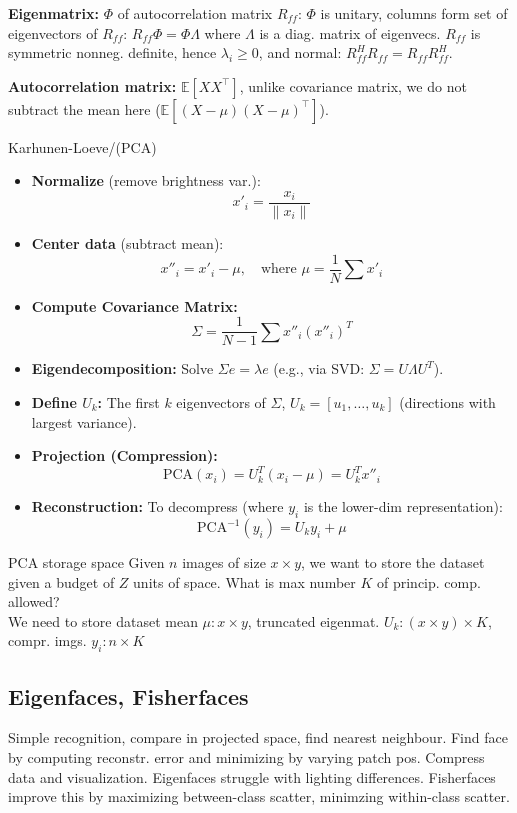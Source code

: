 \documentclass[a4paper,9pt]{article}
\begin{document}
\textbf{Eigenmatrix:} $\Phi$ of autocorrelation matrix $R_{ff}$: $\Phi$ is unitary, columns form set of eigenvectors of $R_{ff}$: $R_{ff} \Phi = \Phi \Lambda$ where $\Lambda$ is a diag. matrix of eigenvecs. $R_{ff}$ is symmetric nonneg. definite, hence $\lambda_i \ge 0$, and normal: $R_{ff}^H R_{ff} = R_{ff} R_{ff}^H$.

\textbf{Autocorrelation matrix:} $\mathbb{E}[X X^\top]$, unlike covariance matrix, we do not subtract the mean here ($\mathbb{E}[(X - \mu) (X - \mu)^\top]$).
\begin{mainbox}{Karhunen-Loeve/(PCA)}
        \begin{itemize}
            \item \textbf{Normalize} (remove brightness var.): 
            \[ x'_i = \frac{x_i}{\|x_i\|} \]
            \item \textbf{Center data} (subtract mean): 
            \[ x''_i = x'_i - \mu, \quad \text{where } \mu = \frac{1}{N} \sum x'_i \]
            \item \textbf{Compute Covariance Matrix:} 
            \[ \Sigma = \frac{1}{N - 1} \sum x''_i (x''_i)^T \]
            \item \textbf{Eigendecomposition:} Solve $\Sigma e = \lambda e$ (e.g., via SVD: $\Sigma = U \Lambda U^T$).
            \item \textbf{Define $U_k$:} The first $k$ eigenvectors of $\Sigma$, $U_k = [u_1, \dots, u_k]$ (directions with largest variance).
            \item \textbf{Projection (Compression):} 
            \[ \text{PCA}(x_i) = U_k^T (x_i - \mu) = U_k^T x''_i \]
            \item \textbf{Reconstruction:} To decompress (where $y_i$ is the lower-dim representation):
            \[ \text{PCA}^{-1}(y_i) = U_k y_i + \mu \]
        \end{itemize}
        \begin{subbox}{PCA storage space}
          Given $n$ images of size $x \times y$, we want to store the dataset given a budget of $Z$ units of space. What is max number $K$ of princip. comp. allowed? \\
  We need to store dataset mean $\mu: x \times y$, truncated eigenmat. $U_k: (x \times y) \times K$, compr. imgs. ${y_i}: n \times K$
        \end{subbox}
\end{mainbox}

\subsection{Eigenfaces, Fisherfaces}
Simple recognition, compare in projected space, find nearest neighbour. Find face by computing reconstr. error and minimizing by varying patch pos. Compress data and visualization. Eigenfaces struggle with lighting differences. Fisherfaces improve this by maximizing between-class scatter, minimzing within-class scatter.
\end{document}
